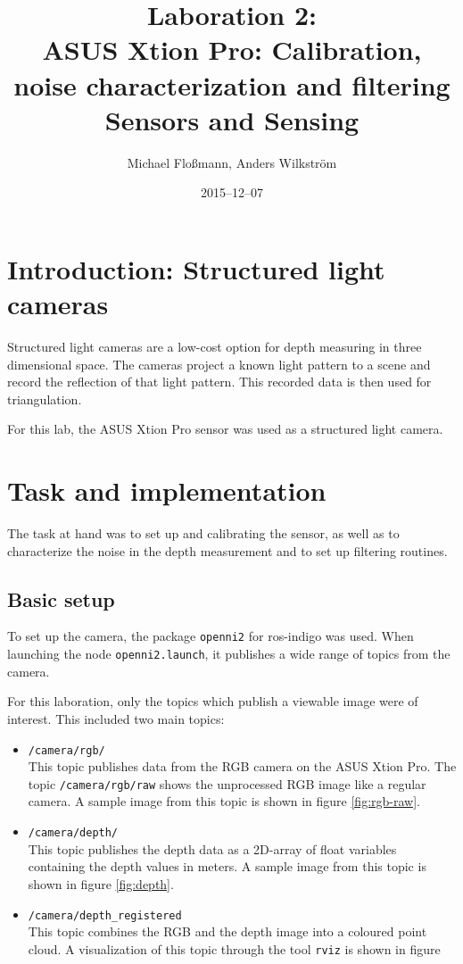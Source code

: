 \documentclass[DIV12,a4paper]{scrartcl}
\title{Laboration 2:\\ ASUS Xtion Pro: Calibration, noise characterization and filtering\\{\small Sensors and Sensing}}
\author{Michael Flo{\ss}mann, Anders Wilkstr\"om}
\date{2015--12--07}
\begin{document}
\maketitle

\section{Introduction: Structured light cameras}
Structured light cameras are a low-cost option for depth measuring in three dimensional space. The cameras project a known light pattern to a scene and record the reflection of that light pattern. This recorded data is then used for triangulation.\par
For this lab, the ASUS Xtion Pro sensor was used as a structured light camera.
\section{Task and implementation}
The task at hand was to set up and calibrating the sensor, as well as to characterize the noise in the depth measurement and to set up filtering routines.
\subsection{Basic setup}
To set up the camera, the package \texttt{openni2} for ros-indigo was used. When launching the node \texttt{openni2.launch}, it publishes a wide range of topics from the camera.\par %
For this laboration, only the topics which publish a viewable image were of interest. This included two main topics:%

\begin{itemize}
  \item \texttt{/camera/rgb/}\\
    This topic publishes data from the RGB camera on the ASUS Xtion Pro. The topic \texttt{/camera/rgb/raw} shows the unprocessed RGB image like a regular camera. A sample image from this topic is shown in figure \ref{fig:rgb-raw}. %
  \item \texttt{/camera/depth/}\\
    This topic publishes the depth data as a 2D-array of float variables containing the depth values in meters. A sample image from this topic is shown in figure \ref{fig:depth}.
  \item \texttt{/camera/depth\_registered}\\
    This topic combines the RGB and the depth image into a coloured point cloud. A visualization of this topic through the tool \texttt{rviz} is shown in figure %
\end{itemize}
\end{document}
